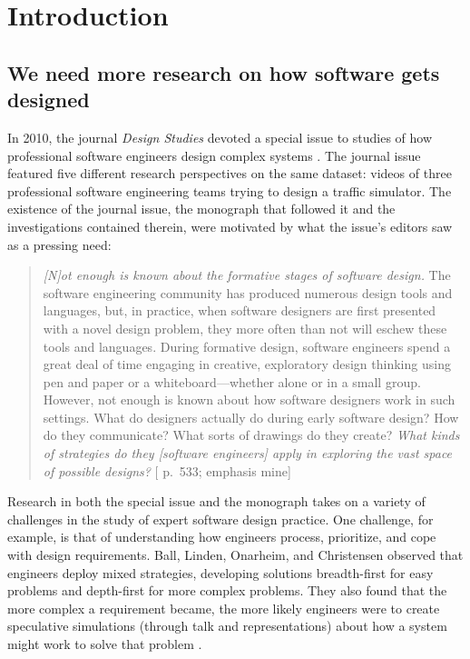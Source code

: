 \section{Introduction}\label{introduction}

\subsection{We need more research on how software gets designed}\label{we-need-more-research-on-how-software-gets-designed}

In 2010, the journal \emph{Design Studies} devoted a special issue to studies of how professional software engineers design complex systems \citep{petre_editorial_2010}. The journal issue featured five different research perspectives on the same dataset: videos of three professional software engineering teams trying to design a traffic simulator. The existence of the journal issue, the monograph that followed it \citep{petre_software_2014} and the investigations contained therein, were motivated by what the issue's editors saw as a pressing need:

\begin{quote}
\emph{{[}N{]}ot enough is known about the formative stages of software design.} The software engineering community has produced numerous design tools and languages, but, in practice, when software designers are first presented with a novel design problem, they more often than not will eschew these tools and languages. During formative design, software engineers spend a great deal of time engaging in creative, exploratory design thinking using pen and paper or a whiteboard---whether alone or in a small group. However, not enough is known about how software designers work in such settings. What do designers actually do during early software design? How do they communicate? What sorts of drawings do they create? \emph{What kinds of strategies do they {[}software engineers{]} apply in exploring the vast space of possible designs?} {[}\citet{petre_editorial_2010} p.~533; emphasis mine{]}
\end{quote}

Research in both the special issue \citep{petre_editorial_2010} and the monograph \citep{petre_software_2014} takes on a variety of challenges in the study of expert software design practice. One challenge, for example, is that of understanding how engineers process, prioritize, and cope with design requirements. Ball, Linden, Onarheim, and Christensen \citeyearpar{ball_design_2010} observed that engineers deploy mixed strategies, developing solutions breadth-first for easy problems and depth-first for more complex problems. They also found that the more complex a requirement became, the more likely engineers were to create speculative simulations (through talk and representations) about how a system might work to solve that problem \citep{ball_design_2010}.

